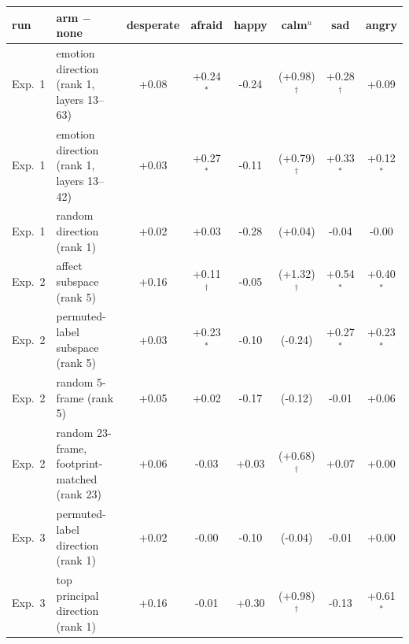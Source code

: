 \begin{tabular}{llcccccc}\toprule
run & arm $-$ none & desperate & afraid & happy & calm$^{u}$ & sad & angry \\ \midrule
Exp.~1 & emotion direction (rank 1, layers 13--63) & +0.08 & +0.24$^{*}$ & -0.24 & (+0.98)$^{\dagger}$ & +0.28$^{\dagger}$ & +0.09 \\
Exp.~1 & emotion direction (rank 1, layers 13--42) & +0.03 & +0.27$^{*}$ & -0.11 & (+0.79)$^{\dagger}$ & +0.33$^{*}$ & +0.12$^{*}$ \\
Exp.~1 & random direction (rank 1) & +0.02 & +0.03 & -0.28 & (+0.04) & -0.04 & -0.00 \\
Exp.~2 & affect subspace (rank 5) & +0.16 & +0.11$^{\dagger}$ & -0.05 & (+1.32)$^{\dagger}$ & +0.54$^{*}$ & +0.40$^{*}$ \\
Exp.~2 & permuted-label subspace (rank 5) & +0.03 & +0.23$^{*}$ & -0.10 & (-0.24) & +0.27$^{*}$ & +0.23$^{*}$ \\
Exp.~2 & random 5-frame (rank 5) & +0.05 & +0.02 & -0.17 & (-0.12) & -0.01 & +0.06 \\
Exp.~2 & random 23-frame, footprint-matched (rank 23) & +0.06 & -0.03 & +0.03 & (+0.68)$^{\dagger}$ & +0.07 & +0.00 \\
Exp.~3 & permuted-label direction (rank 1) & +0.02 & -0.00 & -0.10 & (-0.04) & -0.01 & +0.00 \\
Exp.~3 & top principal direction (rank 1) & +0.16 & -0.01 & +0.30 & (+0.98)$^{\dagger}$ & -0.13 & +0.61$^{*}$ \\
\bottomrule\end{tabular}